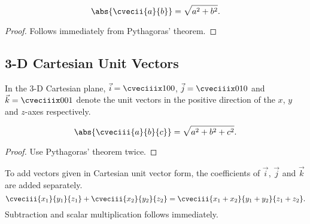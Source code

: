 \begin{proposition}[Magnitude in 2-D]
    \[\abs{\cvecii{a}{b}} = \sqrt{a^2 + b^2}.\]
\end{proposition}
\begin{proof}
    Follows immediately from Pythagoras' theorem.
\end{proof}

\subsection{3-D Cartesian Unit Vectors}

\begin{definition}
    In the 3-D Cartesian plane, $\vec i = \cveciiix100$, $\vec j = \cveciiix010$ and $\vec k = \cveciiix001$ denote the unit vectors in the positive direction of the $x$, $y$ and $z$-axes respectively.
\end{definition}

\begin{proposition}[Magnitude in 3-D]
    \[\abs{\cveciii{a}{b}{c}} = \sqrt{a^2 + b^2 + c^2}.\]
\end{proposition}
\begin{proof}
    Use Pythagoras' theorem twice.
\end{proof}

\begin{fact}
    To add vectors given in Cartesian unit vector form, the coefficients of $\vec i$, $\vec j$ and $\vec k$ are added separately. \[\cveciii{x_1}{y_1}{z_1} + \cveciii{x_2}{y_2}{z_2} = \cveciii{x_1+x_2}{y_1+y_2}{z_1+z_2}.\] Subtraction and scalar multiplication follows immediately.
\end{fact}